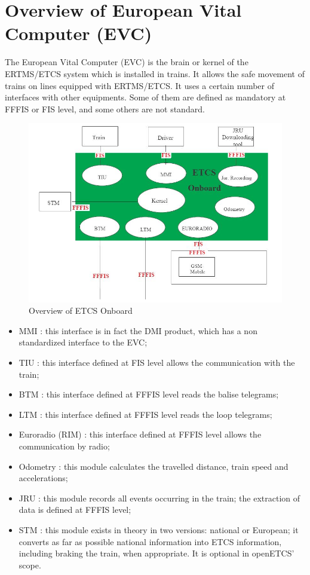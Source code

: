 \documentclass[nocc]{template/openetcs_report}
\begin{document}
\section{Overview of European Vital Computer (EVC)}
The European Vital Computer (EVC) is the brain or kernel of the ERTMS/ETCS system which is installed in trains. It allows the safe movement of trains on lines equipped with ERTMS/ETCS. It uses a certain number of interfaces with other equipments. Some of them are defined as mandatory at FFFIS or FIS level, and some others are not standard.
\begin{figure}[!h]
  \centering
  \includegraphics[width=\textwidth]{image/evc_overview}
  \caption{Overview of ETCS Onboard}
  \label{fig:Overview of ETCS Onboard}
\end{figure}
\begin{itemize}
\item MMI : this interface is in fact the DMI product, which has a non standardized interface to the EVC;
\item	TIU : this interface defined at FIS level allows the communication with the train;
\item	BTM : this interface defined at FFFIS level reads the balise telegrams;
\item	LTM : this interface defined at FFFIS level reads the loop telegrams;
\item	Euroradio (RIM) : this interface defined at FFFIS level allows the communication by radio;
\item	Odometry : this module calculates the travelled distance, train speed and accelerations;
\item	JRU : this module records all events occurring in the train; the extraction of data is defined at FFFIS level;
\item	STM : this module exists in theory in two versions: national or European; it converts as far as possible national information into ETCS information, including braking the train, when appropriate. It is optional in openETCS' scope.
\end{itemize}
\end{document}
